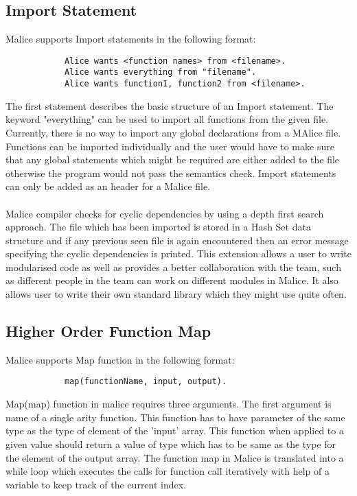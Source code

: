 \documentclass[a4wide, 11pt]{article}
\begin{document}
	\subsection{Import Statement}
		Malice supports Import statements in the following format:
		\begin{verbatim}
		    Alice wants <function names> from <filename>.
		    Alice wants everything from "filename".
		    Alice wants function1, function2 from <filename>.
		\end{verbatim}
		The first statement describes the basic structure of an Import statement. The keyword "everything" can be used to import all functions from the given file. Currently, there is no way to import any global declarations from a MAlice file. Functions can be imported individually and the user would have to make sure that any global statements which might be required are either added to the file otherwise the program would not pass the semantics check. Import statements can only be added as an header for a Malice file.
		\\
		\\
		Malice compiler checks for cyclic dependencies by using a depth first search approach. The file which has been imported is stored
		in a Hash Set data structure and if any previous seen file is again encountered then an error message specifying the cyclic dependencies
		is printed. This extension allows a user to write modularised code as well as provides a better collaboration with the team, such as
		different people in the team can work on different modules in Malice. It also allows user to write their own standard library which they
		might use quite often.

	\subsection{Higher Order Function Map}
		Malice supports Map function in the following format:
		\begin{verbatim}
		    map(functionName, input, output).
		\end{verbatim}
		Map(map) function in malice requires three arguments. The first argument is name of a single arity function. This function has
		to have parameter of the same type as the type of element of the 'input' array. This function when applied to a given value should
		return a value of type which has to be same as the type for the element of the output array. The function map in Malice is translated
		into a while loop which executes the calls for function call iteratively with help of a variable to keep track of the current index.
		
\end{document}
